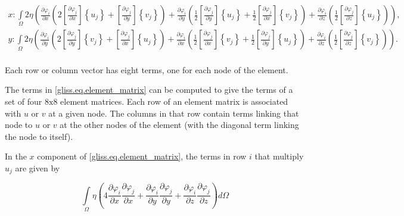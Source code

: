 \begin{equation}
  \label{gliss.eq.element_matrix}
  \begin{split}
    x: \int\limits_{\Omega }{2\eta \left( \frac{\partial {{\varphi }_{i}}}{\partial x}\left( 2\left[ \frac{\partial {{\varphi }_{j}}}{\partial x} \right]\left\{ {{u}_{j}} \right\}+\left[ \frac{\partial {{\varphi }_{j}}}{\partial y} \right]\left\{ {{v}_{j}} \right\} \right)+\frac{\partial {{\varphi }_{i}}}{\partial y}\left( \frac{1}{2}\left[ \frac{\partial {{\varphi }_{j}}}{\partial y} \right]\left\{ {{u}_{j}} \right\}+\frac{1}{2}\left[ \frac{\partial {{\varphi }_{j}}}{\partial x} \right]\left\{ {{v}_{j}} \right\} \right)+\frac{\partial {{\varphi }_{i}}}{\partial z}\left( \frac{1}{2}\left[ \frac{\partial {{\varphi }_{j}}}{\partial z} \right]\left\{ {{u}_{j}} \right\} \right) \right)},  \\
    y: \int\limits_{\Omega }{2\eta \left( \frac{\partial {{\varphi }_{i}}}{\partial y}\left( 2\left[ \frac{\partial {{\varphi }_{j}}}{\partial y} \right]\left\{ {{v}_{j}} \right\}+\left[ \frac{\partial {{\varphi }_{j}}}{\partial x} \right]\left\{ {{u}_{j}} \right\} \right)+\frac{\partial {{\varphi }_{i}}}{\partial x}\left( \frac{1}{2}\left[ \frac{\partial {{\varphi }_{j}}}{\partial x} \right]\left\{ {{v}_{j}} \right\}+\frac{1}{2}\left[ \frac{\partial {{\varphi }_{j}}}{\partial y} \right]\left\{ {{u}_{j}} \right\} \right)+\frac{\partial {{\varphi }_{i}}}{\partial z}\left( \frac{1}{2}\left[ \frac{\partial {{\varphi }_{j}}}{\partial z} \right]\left\{ {{v}_{j}} \right\} \right) \right)}.  \\
  \end{split}
\end{equation}

\noindent
Each row or column vector has eight terms, one for each node of the element.

The terms in \eqref{gliss.eq.element_matrix} can be computed to give the terms of a set of four $8\text{x}8$ element matrices.
Each row of an element matrix is associated with $u$ or $v$ at a given node.  The columns in that row contain terms
linking that node to $u$ or $v$ at the other nodes of the element (with the diagonal term linking the node to itself).  

In the $x$ component of \eqref{gliss.eq.element_matrix}, 
the terms in row $i$ that multiply $u_j$ are given by
 
\begin{equation}
  \label{gliss.eq.matrix_Kuu}
  \int\limits_{\Omega }{\eta \left( 4\frac{\partial {{\varphi }_{i}}}{\partial x}\frac{\partial {{\varphi }_{j}}}{\partial x}+\frac{\partial {{\varphi }_{i}}}{\partial y}\frac{\partial {{\varphi}_{j}}}{\partial y}+\frac{\partial {{\varphi }_{i}}}{\partial z}\frac{\partial {{\varphi }_{j}}}{\partial z} \right)}d\Omega
\end{equation}

